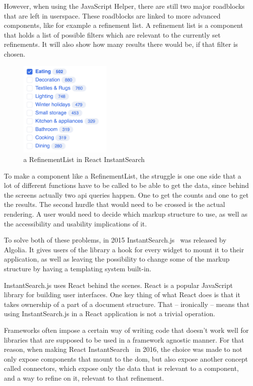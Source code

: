 However, when using the JavaScript Helper, there are still two major roadblocks that are left in \gls{userspace}. These roadblocks are linked to more advanced components, like for example a refinement list. A refinement list is a component that holds a list of possible filters which are relevant to the currently set refinements. It will also show how many results there would be, if that filter is chosen.

\begin{figure}[H]
  \centering
  \includegraphics[width=0.4\textwidth]{../assets/refinementlist.png}
  \caption{a RefinementList in React InstantSearch\cite{ris-storybooks}}
  \label{figure:refinementlist-ris}
\end{figure}

To make a component like a RefinementList, the struggle is one one side that a lot of different functions have to be called to be able to get the data, since behind the screens actually two \acrshort{api} queries happen. One to get the counts and one to get the results. The second hurdle that would need to be crossed is the actual rendering. A user would need to decide which markup structure to use, as well as the accessibility and usability implications of it.

To solve both of these problems, in 2015 InstantSearch.js~\cite{instantsearch-js} was released by Algolia. It gives users of the \gls{library} a hook for every widget to mount it to their application, as well as leaving the possibility to change some of the markup structure by having a templating system built-in.

InstantSearch.js uses React behind the scenes. React\cite{react-doc} is a popular JavaScript \gls{library} for building user interfaces. One key thing of what React does is that it takes ownership of a part of a document structure. That -- ironically -- means that using InstantSearch.js in a React application is not a trivial operation.

Frameworks often impose a certain way of writing code that doesn't work well for libraries that are supposed to be used in a framework agnostic manner. For that reason, when making React InstantSearch~\cite{react-instantsearch} in 2016, the choice was made to not only expose components that mount to the \acrshort{dom}, but also expose another concept called connectors, which expose only the data that is relevant to a component, and a way to refine on it, relevant to that refinement.

